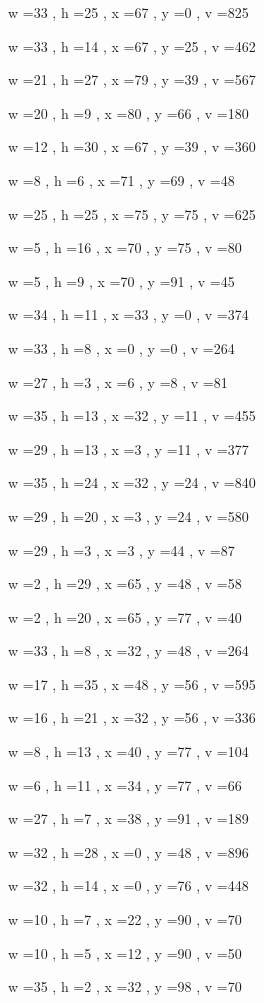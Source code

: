 \documentclass[11pt]{article}
\begin{document}
w =33 , h =25 , x =67 , y =0 , v =825
\par
w =33 , h =14 , x =67 , y =25 , v =462
\par
w =21 , h =27 , x =79 , y =39 , v =567
\par
w =20 , h =9 , x =80 , y =66 , v =180
\par
w =12 , h =30 , x =67 , y =39 , v =360
\par
w =8 , h =6 , x =71 , y =69 , v =48
\par
w =25 , h =25 , x =75 , y =75 , v =625
\par
w =5 , h =16 , x =70 , y =75 , v =80
\par
w =5 , h =9 , x =70 , y =91 , v =45
\par
w =34 , h =11 , x =33 , y =0 , v =374
\par
w =33 , h =8 , x =0 , y =0 , v =264
\par
w =27 , h =3 , x =6 , y =8 , v =81
\par
w =35 , h =13 , x =32 , y =11 , v =455
\par
w =29 , h =13 , x =3 , y =11 , v =377
\par
w =35 , h =24 , x =32 , y =24 , v =840
\par
w =29 , h =20 , x =3 , y =24 , v =580
\par
w =29 , h =3 , x =3 , y =44 , v =87
\par
w =2 , h =29 , x =65 , y =48 , v =58
\par
w =2 , h =20 , x =65 , y =77 , v =40
\par
w =33 , h =8 , x =32 , y =48 , v =264
\par
w =17 , h =35 , x =48 , y =56 , v =595
\par
w =16 , h =21 , x =32 , y =56 , v =336
\par
w =8 , h =13 , x =40 , y =77 , v =104
\par
w =6 , h =11 , x =34 , y =77 , v =66
\par
w =27 , h =7 , x =38 , y =91 , v =189
\par
w =32 , h =28 , x =0 , y =48 , v =896
\par
w =32 , h =14 , x =0 , y =76 , v =448
\par
w =10 , h =7 , x =22 , y =90 , v =70
\par
w =10 , h =5 , x =12 , y =90 , v =50
\par
w =35 , h =2 , x =32 , y =98 , v =70
\par
\newpage
\end{document}
